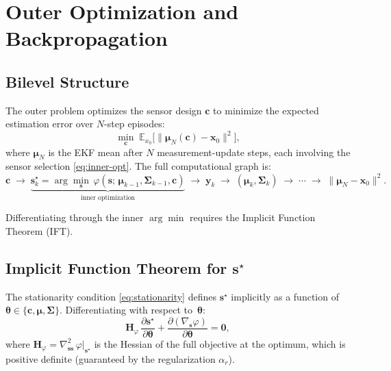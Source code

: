 \documentclass[11pt]{article}
\newcommand{\bx}{\bm{x}}
\newcommand{\by}{\bm{y}}
\newcommand{\bs}{\bm{s}}
\newcommand{\bc}{\bm{c}}
\newcommand{\bmu}{\bm{\mu}}
\newcommand{\sstar}{\bs^{\star}}
\theoremstyle{definition}
\begin{document}
\section{Outer Optimization and Backpropagation}
\label{sec:outer}

\subsection{Bilevel Structure}

The outer problem optimizes the sensor design $\bc$ to minimize the
expected estimation error over $N$-step episodes:
\begin{equation}
  \min_{\bc}\;\mathbb{E}_{x_0}\bigl[\|\bmu_N(\bc) - \bx_0\|^2\bigr],
  \label{eq:outer}
\end{equation}
where $\bmu_N$ is the EKF mean after $N$ measurement-update steps, each
involving the sensor selection \eqref{eq:inner-opt}.  The full
computational graph is:
\begin{equation}
  \bc \;\longrightarrow\;
  \underbrace{\sstar_k = \arg\min_{\bs}\,\varphi(\bs;\,\bmu_{k-1},\bm{\Sigma}_{k-1},\bc)}_{\text{inner optimization}}
  \;\longrightarrow\;
  \by_k
  \;\longrightarrow\;
  (\bmu_k, \bm{\Sigma}_k)
  \;\longrightarrow\; \cdots \;\longrightarrow\;
  \|\bmu_N - \bx_0\|^2.
  \label{eq:comp-graph}
\end{equation}

Differentiating through the inner $\arg\min$ requires the Implicit
Function Theorem (IFT).

\subsection{Implicit Function Theorem for $\sstar$}

The stationarity condition \eqref{eq:stationarity} defines $\sstar$
implicitly as a function of $\bm{\theta} \in \{\bc, \bmu, \bm{\Sigma}\}$.
Differentiating with respect to~$\bm{\theta}$:
\begin{equation}
  \bm{H}_\varphi\,\frac{\partial \sstar}{\partial \bm{\theta}}
  + \frac{\partial (\nabla_{\bs}\varphi)}{\partial \bm{\theta}} = \bm{0},
  \label{eq:ift-identity}
\end{equation}
where $\bm{H}_\varphi = \nabla^2_{\bs\bs}\,\varphi\big|_{\sstar}$ is
the Hessian of the full objective at the optimum, which is positive
definite (guaranteed by the regularization $\alpha_r$).
\end{document}
